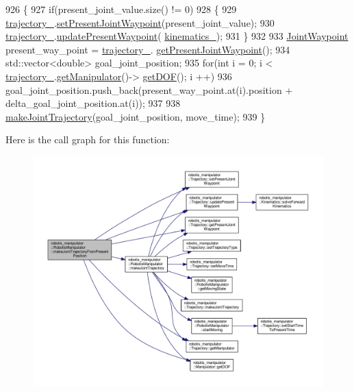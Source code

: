 \begin{DoxyCode}
926 \{
927   \textcolor{keywordflow}{if}(present\_joint\_value.size() != 0)
928   \{
929     \hyperlink{classrobotis__manipulator_1_1_robotis_manipulator_a992d2c7221bcaab8e9a688d12728d738}{trajectory\_}.\hyperlink{classrobotis__manipulator_1_1_trajectory_a58b1d4fb60f7e3ed9150d312766debc1}{setPresentJointWaypoint}(present\_joint\_value);
930     \hyperlink{classrobotis__manipulator_1_1_robotis_manipulator_a992d2c7221bcaab8e9a688d12728d738}{trajectory\_}.\hyperlink{classrobotis__manipulator_1_1_trajectory_a05e95f1473723592130f63321664fb0c}{updatePresentWaypoint}(
      \hyperlink{classrobotis__manipulator_1_1_robotis_manipulator_a9a37fd068504dfe5fab346884790fc8f}{kinematics\_});
931   \}
932 
933   \hyperlink{namespacerobotis__manipulator_a4456fd8b14e1f6b7733a77837dfe9339}{JointWaypoint} present\_way\_point = \hyperlink{classrobotis__manipulator_1_1_robotis_manipulator_a992d2c7221bcaab8e9a688d12728d738}{trajectory\_}.
      \hyperlink{classrobotis__manipulator_1_1_trajectory_a840fce5e4b16eb4ef957ff0aba2bf146}{getPresentJointWaypoint}();
934   std::vector<double> goal\_joint\_position;
935   \textcolor{keywordflow}{for}(\textcolor{keywordtype}{int} i = 0; i < \hyperlink{classrobotis__manipulator_1_1_robotis_manipulator_a992d2c7221bcaab8e9a688d12728d738}{trajectory\_}.\hyperlink{classrobotis__manipulator_1_1_trajectory_ae5276de42edf154de107c1f194f6b322}{getManipulator}()->
      \hyperlink{classrobotis__manipulator_1_1_manipulator_a2be640cd5d1fb496f5a6ccd2bb29d781}{getDOF}(); i ++)
936     goal\_joint\_position.push\_back(present\_way\_point.at(i).position + delta\_goal\_joint\_position.at(i));
937 
938   \hyperlink{classrobotis__manipulator_1_1_robotis_manipulator_a10670957d0b6522651b2494d0296cfd4}{makeJointTrajectory}(goal\_joint\_position, move\_time);
939 \}
\end{DoxyCode}


Here is the call graph for this function\+:\nopagebreak
\begin{figure}[H]
\begin{center}
\leavevmode
\includegraphics[width=350pt]{classrobotis__manipulator_1_1_robotis_manipulator_a8278c9edbe6ebca76b20a158ef0dd0bf_cgraph}
\end{center}
\end{figure}


